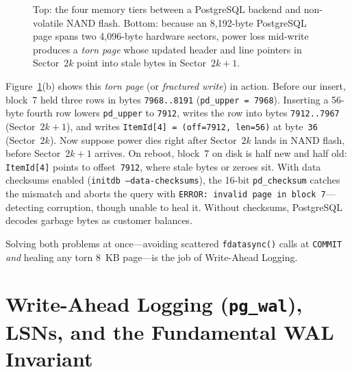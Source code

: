 \begin{figure}[H]
\caption{Top: the four memory tiers between a PostgreSQL backend and non-volatile NAND flash. Bottom: because an 8,192-byte PostgreSQL page spans two 4,096-byte hardware sectors, power loss mid-write produces a \emph{torn page} whose updated header and line pointers in Sector~$2k$ point into stale bytes in Sector~$2k+1$.}
\label{ch04:fig-write-stack}
\end{figure}

Figure~\ref{ch04:fig-write-stack}(b) shows this \emph{torn page} (or \emph{fractured write}) in action. Before our insert, block~7 held three rows in bytes \texttt{7968..8191} (\texttt{pd\_upper = 7968}). Inserting a 56-byte fourth row lowers \texttt{pd\_upper} to \texttt{7912}, writes the row into bytes \texttt{7912..7967} (Sector~$2k+1$), and writes \texttt{ItemId[4] = (off=7912, len=56)} at byte~\texttt{36} (Sector~$2k$). Now suppose power dies right after Sector~$2k$ lands in NAND flash, before Sector~$2k+1$ arrives. On reboot, block~7 on disk is half new and half old: \texttt{ItemId[4]} points to offset~\texttt{7912}, where stale bytes or zeroes sit. With data checksums enabled (\texttt{initdb --data-checksums}), the 16-bit \texttt{pd\_checksum} catches the mismatch and aborts the query with \texttt{ERROR: invalid page in block 7}---detecting corruption, though unable to heal it. Without checksums, PostgreSQL decodes garbage bytes as customer balances.

Solving both problems at once---avoiding scattered \texttt{fdatasync()} calls at \texttt{COMMIT} \emph{and} healing any torn 8~KB page---is the job of Write-Ahead Logging.

\section{Write-Ahead Logging (\texttt{pg\_wal}), LSNs, and the Fundamental WAL Invariant}
\label{ch04:wal-invariant}

